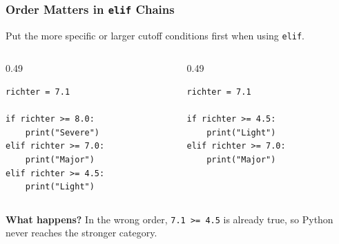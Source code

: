 \documentclass[aspectratio=169,10pt]{beamer}
\begin{document}
\begin{frame}[fragile]
\frametitle{Order Matters in \texttt{elif} Chains}
\begin{tcolorbox}[lecturebox,title=Key idea]
Put the more specific or larger cutoff conditions first when using \texttt{elif}.
\end{tcolorbox}

\begin{columns}[T,totalwidth=\textwidth]
\begin{column}{0.49\textwidth}
\begin{tcolorbox}[lecturebox,title=Correct order]
\begin{lstlisting}[style=pycodesmall]
richter = 7.1

if richter >= 8.0:
    print("Severe")
elif richter >= 7.0:
    print("Major")
elif richter >= 4.5:
    print("Light")
\end{lstlisting}
\end{tcolorbox}
\end{column}
\begin{column}{0.49\textwidth}
\begin{tcolorbox}[lecturebox,title=Wrong order]
\begin{lstlisting}[style=pycodesmall]
richter = 7.1

if richter >= 4.5:
    print("Light")
elif richter >= 7.0:
    print("Major")
\end{lstlisting}
\end{tcolorbox}
\end{column}
\end{columns}

\textbf{What happens?} In the wrong order, \texttt{7.1 >= 4.5} is already true, so Python never reaches the stronger category.
\end{frame}
\end{document}
